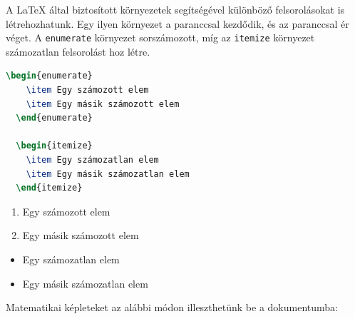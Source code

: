 A \LaTeX{} által biztosított környezetek segítségével különböző felsorolásokat
is létrehozhatunk. Egy ilyen környezet a
paranccsal kezdődik, és az
paranccsal ér véget. A \texttt{enumerate} környezet sorszámozott, míg az
\texttt{itemize} környezet számozatlan felsorolást hoz létre.

\begin{minipage}[t]{.5\textwidth}
	\begin{lstlisting}[language=tex,caption={Felsorolások}]
  \begin{enumerate}
    \item Egy számozott elem
    \item Egy másik számozott elem
  \end{enumerate}

  \begin{itemize}
    \item Egy számozatlan elem
    \item Egy másik számozatlan elem
  \end{itemize}
\end{lstlisting}
\end{minipage}%
\begin{minipage}[t]{.5\textwidth}
	\vspace{12pt}
	\begin{enumerate}
		\item Egy számozott elem
		\item Egy másik számozott elem
	\end{enumerate}

	\begin{itemize}
		\item Egy számozatlan elem
		\item Egy másik számozatlan elem
	\end{itemize}
\end{minipage}

Matematikai képleteket az alábbi módon illeszthetünk be a dokumentumba:

